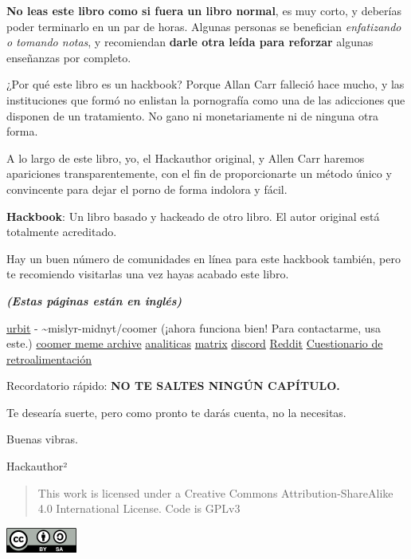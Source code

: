 \documentclass[
  spanish,
  openany]{book}
\let\oldhref\href
\renewcommand{\href}[2]{\textcolor{linkcolor}{\oldhref{#1}{#2}}}
\begin{document}
\textbf{No leas este libro como si fuera un libro normal}, es muy corto, y deberías poder terminarlo en un par de horas. Algunas personas se benefician \emph{enfatizando o tomando notas}, y recomiendan \textbf{darle otra leída para reforzar} algunas enseñanzas por completo.

¿Por qué este libro es un hackbook? Porque Allan Carr falleció hace mucho, y las instituciones que formó no enlistan la pornografía como una de las adicciones que disponen de un tratamiento. No gano ni monetariamente ni de ninguna otra forma.

A lo largo de este libro, yo, el Hackauthor original, y Allen Carr haremos apariciones transparentemente, con el fin de proporcionarte un método único y convincente para dejar el porno de forma indolora y fácil.

\textbf{Hackbook}: Un libro basado y hackeado de otro libro. El autor original está totalmente acreditado.

Hay un buen número de comunidades en línea para este hackbook también, pero te recomiendo visitarlas una vez hayas acabado este libro.

\emph{\textbf{(Estas páginas están en inglés)}}

\href{https://urbit.org}{urbit} - \textasciitilde mislyr-midnyt/coomer (¡ahora funciona bien! Para contactarme, usa este.) \textbar{} \href{https://coomer.org/}{coomer meme archive} \textbar{} \href{https://plausible.io/easypeasymethod.org}{analiticas} \textbar{} \href{https://matrix.to/}{matrix} \textbar{} \href{https://discord.com/invite/bCXEnf9}{discord} \textbar{} \href{https://www.reddit.com/r/pmohackbook/}{Reddit} \textbar{} \href{https://docs.google.com/forms/d/e/1FAIpQLSfi27XGmChe_qtu4fP6E6lNyjY8Ia_93TlfGbjbKgiI1VNdkg/viewform}{Cuestionario de retroalimentación}

Recordatorio rápido: \textbf{NO TE SALTES NINGÚN CAPÍTULO.}

Te desearía suerte, pero como pronto te darás cuenta, no la necesitas.

Buenas vibras.

Hackauthor²

\begin{quote}
This work is licensed under a Creative Commons Attribution-ShareAlike 4.0 International License. Code is GPLv3
\end{quote}

\includegraphics{img-cc-by-sa.png}\\
\end{document}
